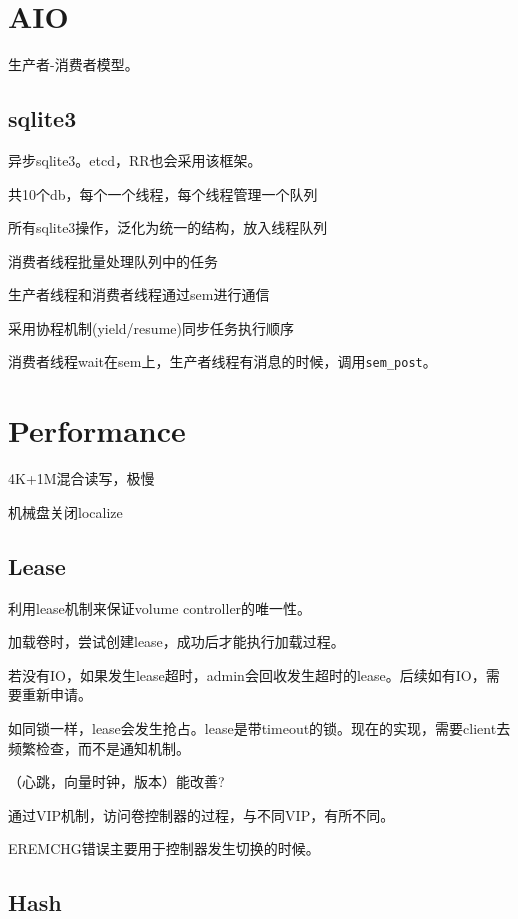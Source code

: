 \section{AIO}

生产者-消费者模型。

\subsection{sqlite3}

异步sqlite3。etcd，RR也会采用该框架。

\begin{compactitem}
    \item 共10个db，每个一个线程，每个线程管理一个队列
    \item 所有sqlite3操作，泛化为统一的结构，放入线程队列
    \item 消费者线程批量处理队列中的任务
    \item 生产者线程和消费者线程通过sem进行通信
    \item 采用协程机制(yield/resume)同步任务执行顺序
\end{compactitem}

消费者线程wait在sem上，生产者线程有消息的时候，调用\verb|sem_post|。

\section{Performance}

4K+1M混合读写，极慢

机械盘关闭localize

\subsection{Lease}

利用lease机制来保证volume controller的唯一性。

加载卷时，尝试创建lease，成功后才能执行加载过程。

若没有IO，如果发生lease超时，admin会回收发生超时的lease。后续如有IO，需要重新申请。

如同锁一样，lease会发生抢占。lease是带timeout的锁。现在的实现，需要client去频繁检查，而不是通知机制。

（心跳，向量时钟，版本）能改善?

通过VIP机制，访问卷控制器的过程，与不同VIP，有所不同。

EREMCHG错误主要用于控制器发生切换的时候。

\subsection{Hash}

